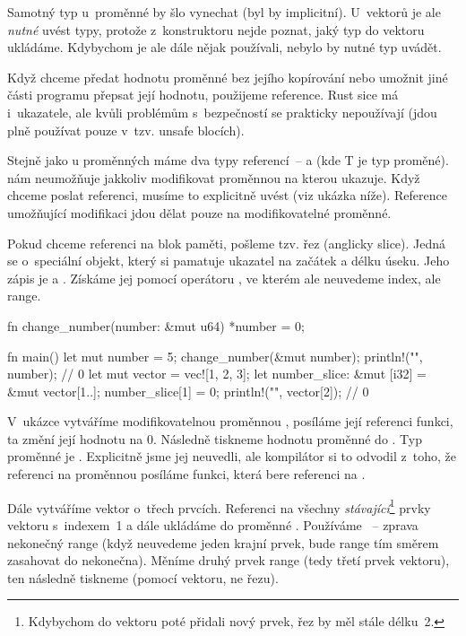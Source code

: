 \documentclass[main.tex]{subfiles}
\begin{document}
Samotný typ u~proměnné  by šlo vynechat (byl by implicitní). U~vektorů je ale
\emph{nutné} uvést typy, protože z~konstruktoru nejde poznat, jaký typ do vektoru
ukládáme. Kdybychom je ale dále nějak používali, nebylo by nutné typ uvádět.


Když chceme předat hodnotu proměnné bez jejího kopírování nebo umožnit jiné části programu
přepsat její hodnotu, použijeme reference. Rust sice má i~ukazatele, ale kvůli problémům
s~bezpečností se prakticky nepoužívají (jdou plně používat pouze v~tzv. unsafe blocích).

Stejně jako u proměnných máme dva typy referencí~--  a  (kde T je
typ proměné).  nám neumožňuje jakkoliv modifikovat proměnnou na kterou ukazuje.
Když chceme poslat referenci, musíme to explicitně uvést (viz ukázka níže). Reference
umožňující modifikaci jdou dělat pouze na modifikovatelné proměnné.
\cite[sekce\,4.2]{thebook}

Pokud chceme referenci na blok paměti, pošleme tzv. řez (anglicky slice). Jedná se
o~speciální objekt, který si pamatuje ukazatel na začátek a délku úseku. Jeho zápis je
\irust{&[T]} a . Získáme jej pomocí operátoru \irust{[]}, ve kterém ale
neuvedeme index, ale range. \cite[sekce\,4.3]{thebook}

\obrazek
\begin{rustcode}
    fn change_number(number: &mut u64) {
        *number = 0;
    }

    fn main() {
        let mut number = 5;
        change_number(&mut number);
        println!("{}", number); // 0
        let mut vector = vec![1, 2, 3];
        let number_slice: &mut [i32] = &mut vector[1..];
        number_slice[1] = 0;
        println!("{}", vector[2]); // 0
    }
\end{rustcode}

V~ukázce vytváříme modifikovatelnou proměnnou , posíláme její referenci
funkci, ta změní její hodnotu na 0. Následně tiskneme hodnotu proměnné do .
Typ proměnné je . Explicitně jsme jej neuvedli, ale kompilátor si to odvodil
z~toho, že referenci na proměnnou posíláme funkci, která bere referenci na .

Dále vytváříme vektor o~třech prvcích. Referenci na všechny \emph{stávající}\footnote{
    Kdybychom do vektoru poté přidali nový prvek, řez by měl stále délku~2.
} prvky vektoru s~indexem~1 a dále ukládáme do proměnné . Používáme
~-- zprava nekonečný range (když neuvedeme jeden krajní prvek, bude range tím
směrem zasahovat do nekonečna). Měníme druhý prvek range (tedy třetí prvek vektoru), ten
následně tiskneme (pomocí vektoru, ne řezu).
\end{document}
